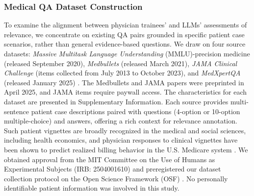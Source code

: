 \documentclass[fleqn,10pt]{wlscirep}
\begin{document}
\subsubsection{Medical QA Dataset Construction}
To examine the alignment between physician trainees’ and LLMs’ assessments of relevance, we concentrate on existing QA pairs grounded in specific patient case scenarios, rather than general evidence-based questions. We draw on four source datasets: \textit{Massive Multitask Language Understanding}  (MMLU)-precision medicine (released September 2020)\cite{hendrycks_measuring_2021}, \textit{Medbullets} (released March 2021), \textit{JAMA Clinical Challenge} (items collected from July 2013 to October 2023)\cite{chen_benchmarking_2025}, and \textit{MedXpertQA} (released January 2025) \cite{zuo_medxpertqa_2025}. The Medbullets and JAMA papers were preprinted in April 2025, and JAMA items require paywall access. The characteristics for each dataset are presented in Supplementary Information. Each source provides multi-sentence patient case descriptions paired with questions (4-option or 10-option multiple-choice) and answers, offering a rich context for relevance annotation. Such patient vignettes are broadly recognized in the medical and social sciences, including health economics, and physician responses to clinical vignettes have been shown to predict realized billing behavior in the U.S. Medicare system \cite{cutler_physician_2019}. We obtained approval from the MIT Committee on the Use of Humans as Experimental Subjects (IRB: 2504001610) and preregistered our dataset collection protocol on the Open Science Framework (OSF) \cite{hao_alhamoud_jeong_puri_torr_kalantari_schaekermann_stern_ghassemi_2025}. No personally identifiable patient information was involved in this study.

\end{document}
